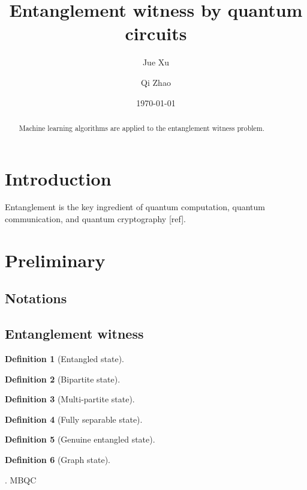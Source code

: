 \documentclass[
aps,
pra,
linenumbers,
floatfix,
]{revtex4-2}
\theoremstyle{plain}
\theoremstyle{definition}
\newtheorem{definition}{Definition}
\begin{document}
\title{Entanglement witness by quantum circuits}
\author{Jue Xu}
\author{Qi Zhao}


\date{\today}
\begin{abstract}
	Machine learning algorithms are applied to the entanglement witness problem.
\end{abstract}

\maketitle
 \tableofcontents

\section{Introduction}
Entanglement \cite{horodeckiQuantumEntanglement2009} is the key ingredient of quantum computation, quantum communication, and quantum cryptography [ref].

\section{Preliminary}
\subsection{Notations}
\subsection{Entanglement witness}
\begin{definition}[Entangled state]
\end{definition}
\begin{definition}[Bipartite state]
\end{definition}
\begin{definition}[Multi-partite state]
\end{definition}
\begin{definition}[Fully separable state]
\end{definition}
\begin{definition}[Genuine entangled state]
\end{definition}
\begin{definition}[Graph state]
\end{definition}
\cite{heinEntanglementGraphStates2006}.
MBQC \cite{briegelMeasurementbasedQuantumComputation2009}
\end{document}
